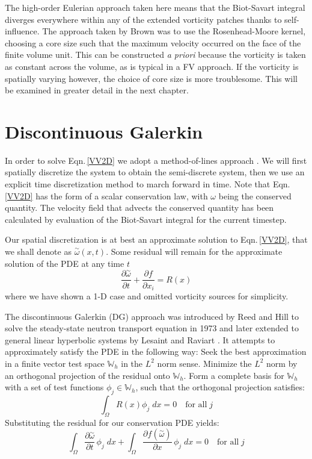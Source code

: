 \documentclass[letterpaper,12pt]{report}
\newcommand{\be}{\begin{equation}}
\newcommand{\ben}[1]{\begin{equation}\label{#1}}
\newcommand{\ee}{\end{equation}}
\newcommand{\aomega}{\overset{\sim}{\omega}}				%
\begin{document}
The high-order Eulerian approach taken here means that the Biot-Savart integral diverges everywhere within any of the extended vorticity patches thanks to self-influence. The approach taken by Brown \cite{Brown2004} was to use the Rosenhead-Moore kernel, choosing a core size such that the maximum velocity occurred on the face of the finite volume unit. This can be constructed \textit{a priori} because the vorticity is taken as constant across the volume, as is typical in a FV approach. If the vorticity is spatially varying however, the choice of core size is more troublesome. This will be examined in greater detail in the next chapter.

\section{Discontinuous Galerkin}
In order to solve Eqn.\,\eqref{VV2D} we adopt a method-of-lines approach \cite{RKDG}. We will first spatially discretize the system to obtain the semi-discrete system, then we use an explicit time discretization method to march forward in time. Note that Eqn.\,\eqref{VV2D} has the form of a scalar conservation law, with $\omega$ being the conserved quantity. The velocity field that advects the conserved quantity has been calculated by evaluation of the Biot-Savart integral for the current timestep.

Our spatial discretization is at best an approximate solution to Eqn.\,\eqref{VV2D}, that we shall denote as $\aomega(x,t)$. Some residual will remain for the approximate solution of the PDE at any time $t$
\ben{VV2D} \frac{\partial \aomega}{\partial t} + \frac{\partial f}{\partial x_i} = R(x)\ee
where we have shown a 1-D case and omitted vorticity sources for simplicity.

The discontinuous Galerkin (DG) approach was introduced by Reed and Hill to solve the steady-state neutron transport equation in 1973 \cite{ReedHill} and later extended to general linear hyperbolic systems by Lesaint and Raviart \cite{Lesaint}. It attempts to approximately satisfy the PDE in the following way: Seek the best approximation in a finite vector test space $\mathbb{W}_h$  in the $L^2$ norm sense. Minimize the $L^2$ norm by an orthogonal projection of the residual onto $\mathbb{W}_h$. Form a complete basis for $\mathbb{W}_h$ with a set of test functions $\phi_j \in \mathbb{W}_h$, such that the orthogonal projection satisfies:
\be \int_\Omega R(x) \phi_j \;dx = 0 \quad\mbox{for all}\; j\ee
Substituting the residual for our conservation PDE yields:
\be \int_\Omega \frac{\partial \aomega}{\partial t} \, \phi_j \;dx + \int_\Omega \frac{\partial f(\aomega)}{\partial x} \, \phi_j \;dx = 0 \quad\mbox{for all}\; j\ee
\end{document}

